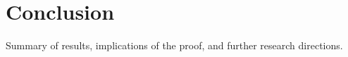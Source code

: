 \section*{Conclusion}
Summary of results, implications of the proof, and further research directions.
